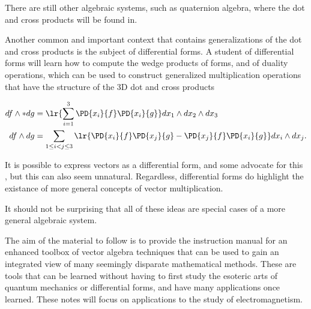 There are still other algebraic systems, such as quaternion algebra, where the dot and cross products will be found in.  

Another common and important context that contains generalizations of the dot and cross products is the subject of differential forms.
A student of differential forms will learn how to compute the wedge products of forms, and of duality operations, which can be used to construct generalized multiplication operations that have the structure of the 3D dot and cross products

\begin{equation}\label{eqn:GAmotivation:160}
\begin{aligned}
df \wedge * dg &= \lr{ \sum_{i=1}^3 \PD{x_i}{f} \PD{x_i}{g} } dx_1 \wedge dx_2 \wedge dx_3 \\
df \wedge dg &= \sum_{1 \le i < j \le 3} \lr{
\PD{x_i}{f} \PD{x_j}{g} 
-\PD{x_j}{f} \PD{x_i}{g} 
}
dx_i \wedge dx_j.
\end{aligned}
\end{equation}

It is possible to express vectors as a differential form, and some advocate for this \citep{flanders1989dfa}, but this can also seem unnatural.  Regardless, differential forms do highlight the existance of more general concepts of vector multiplication.  %

It should not be surprising that all of these ideas are special cases of a more general algebraic system.

The aim of the material to follow is to provide the instruction manual for an enhanced toolbox of vector algebra techniques that can be used to gain an integrated view of many seemingly disparate mathematical methods.  These are tools that can be learned without having to first study the esoteric arts of quantum mechanics or differential forms, and have many applications once learned.  These notes will focus on applications to the study of electromagnetism.

